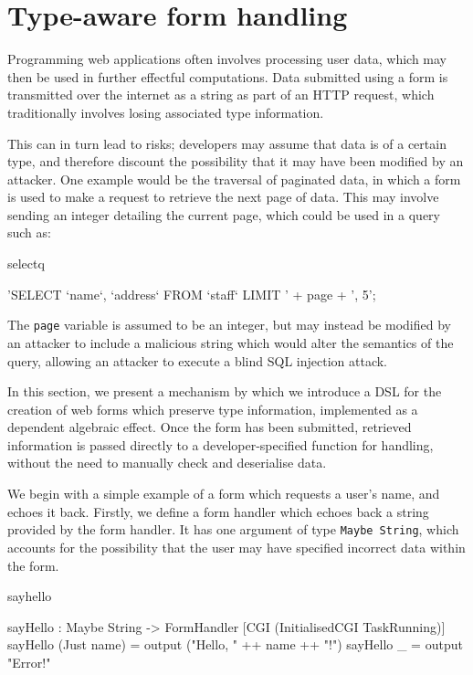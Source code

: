 \section{Type-aware form handling}

\label{form}
Programming web applications often involves processing user data, which may
then be used in further effectful computations. Data submitted using a form is
transmitted over the internet as a string as part of an HTTP request, which
traditionally involves losing associated type information.

This can in turn lead to risks; developers may assume that data is
of a certain type, and therefore discount the possibility that it may have been
modified by an attacker. One example would be the traversal of paginated data,
in which a form is used to make a request to retrieve the next page of data.
This may involve sending an integer detailing the current page, which could be
used in a query such as:

\begin{SaveVerbatim}{selectq}

'SELECT `name`, `address` FROM `staff` LIMIT ' + 
       page + ', 5';

\end{SaveVerbatim}

\noindent
The \texttt{page} variable is assumed to be an integer, but may instead be
modified by an attacker to include a malicious string which would alter the
semantics of the query, allowing an attacker to execute a blind SQL injection
attack. %

In this section, we present a mechanism by which we introduce a DSL
for the creation of web forms which preserve type information, implemented
as a dependent algebraic effect. Once the form has
been submitted, retrieved information is passed directly to a
developer-specified function for handling, without the need to manually check
and deserialise data. 

We begin with a simple example of a form which requests a user's name, and
echoes it back. Firstly, we define a form handler which echoes back a string
provided by the form handler. It has one argument of type \texttt{Maybe
String}, which accounts for the possibility that the user may have specified
incorrect data within the form.

\begin{SaveVerbatim}{sayhello}

sayHello : Maybe String -> 
           FormHandler [CGI (InitialisedCGI TaskRunning)]
sayHello (Just name) = output ("Hello, " ++ name ++ "!")
sayHello _ = output "Error!"

\end{SaveVerbatim}


